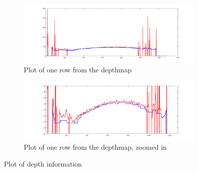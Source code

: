 \begin{figure}[h]
    \centering
    \begin{subfigure}{1\textwidth}
        \centering
        \includegraphics[width=1\linewidth]{images/results/plot_row}
        \caption{Plot of one row from the depthmap} 
        \label{fig:plot1}
    \end{subfigure}\hspace*{\fill}
    
    \medskip
    \begin{subfigure}{1\textwidth}
        \centering
        \includegraphics[width=1\linewidth]{images/results/plot_zoomed}
        \caption{Plot of one row from the depthmap, zoomed in} 
        \label{fig:plot2}
    \end{subfigure}\hspace*{\fill}
    \caption{Plot of depth information}
    \label{fig:row_plot}
\end{figure}


